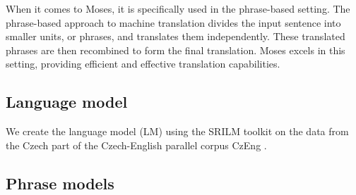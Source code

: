 When it comes to Moses, it is specifically used in the phrase-based setting. The phrase-based approach to machine translation divides the input sentence into smaller units, or phrases, and translates them independently. These translated phrases are then recombined to form the final translation. Moses excels in this setting, providing efficient and effective translation capabilities.


\subsection{Language model}
We create the language model (LM) using the SRILM toolkit \cite{srilm} on the 
data from the Czech part of the Czech-English parallel corpus CzEng \cite{czeng}. 

\subsection{Phrase models}

